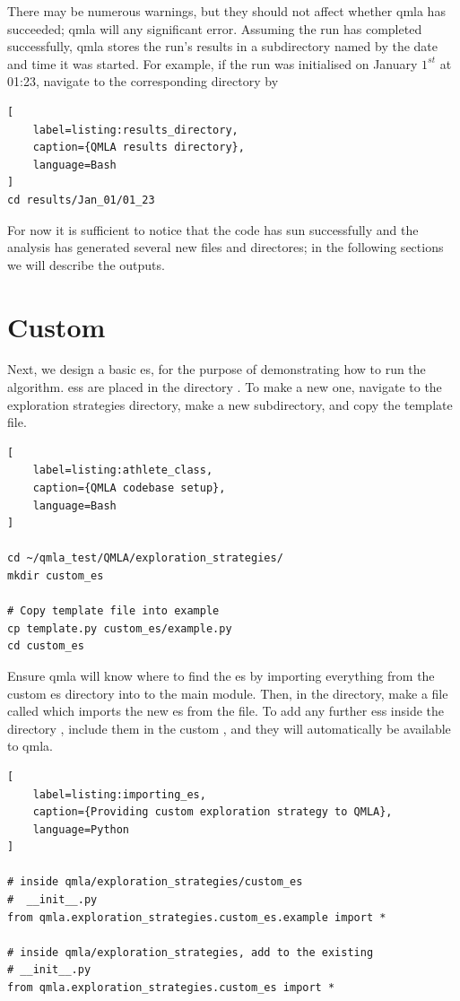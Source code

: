 There may be numerous warnings, but they should not affect whether \gls{qmla} has succeeded; 
    \gls{qmla} will  any significant error. 
Assuming the run has completed successfully, \gls{qmla} stores the run's results in a subdirectory
    named by the date and time it was started.  
For example, if the run was initialised on January $1^{st}$ at 01:23, navigate to the corresponding directory by

\begin{lstlisting}[
    label=listing:results_directory,
    caption={QMLA results directory},
    language=Bash
]
cd results/Jan_01/01_23
\end{lstlisting}

For now it is sufficient to notice that the code has sun successfully and the analysis has generated several new files and directores; 
    in the following sections we will describe the outputs. 

\section{Custom }

Next, we design a basic \gls{es}, for the purpose of demonstrating how to run the algorithm.
\glspl{es} are placed in the directory . 
To make a new one, navigate to the exploration strategies directory, 
make a new subdirectory, and copy the template file. 

\begin{lstlisting}[
    label=listing:athlete_class,
    caption={QMLA codebase setup},
    language=Bash
]

cd ~/qmla_test/QMLA/exploration_strategies/
mkdir custom_es

# Copy template file into example
cp template.py custom_es/example.py
cd custom_es

\end{lstlisting}

Ensure \gls{qmla} will know where to find the \gls{es} by importing everything from the custom \gls{es} 
    directory into to the main  module. 
Then, in the  directory, make a file called  which imports the new \gls{es}
    from the  file. 
To add any further \glspl{es} inside the directory , include them in the custom ,
    and they will automatically be available to \gls{qmla}.

\begin{lstlisting}[
    label=listing:importing_es,
    caption={Providing custom exploration strategy to QMLA},
    language=Python
]

# inside qmla/exploration_strategies/custom_es
#  __init__.py    
from qmla.exploration_strategies.custom_es.example import *

# inside qmla/exploration_strategies, add to the existing
# __init__.py 
from qmla.exploration_strategies.custom_es import *

\end{lstlisting}

